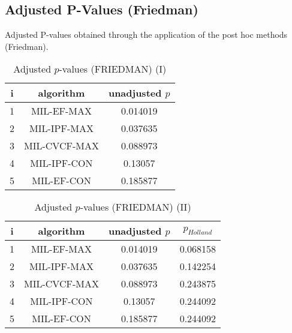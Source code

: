 \documentclass[a4paper,10pt]{article}
\begin{document}
\begin{landscape}
\newpage

\section{Adjusted P-Values (Friedman)}


Adjusted P-values obtained through the application of the post hoc methods (Friedman).

\begin{table}[!htp]
\centering\small
\begin{tabular}{ccc}
i&algorithm&unadjusted $p$\\
\hline1&MIL-EF-MAX&0.014019\\2&MIL-IPF-MAX&0.037635\\3&MIL-CVCF-MAX&0.088973\\4&MIL-IPF-CON&0.13057\\5&MIL-EF-CON&0.185877\\\hline
\end{tabular}
\caption{Adjusted $p$-values (FRIEDMAN) (I)}
\end{table}
\begin{table}[!htp]
\centering\small
\begin{tabular}{cccc}
i&algorithm&unadjusted $p$&$p_{Holland}$\\
\hline1&MIL-EF-MAX&0.014019&0.068158\\2&MIL-IPF-MAX&0.037635&0.142254\\3&MIL-CVCF-MAX&0.088973&0.243875\\4&MIL-IPF-CON&0.13057&0.244092\\5&MIL-EF-CON&0.185877&0.244092\\\hline
\end{tabular}
\caption{Adjusted $p$-values (FRIEDMAN) (II)}
\end{table}

\newpage
\end{landscape}
\end{document}
